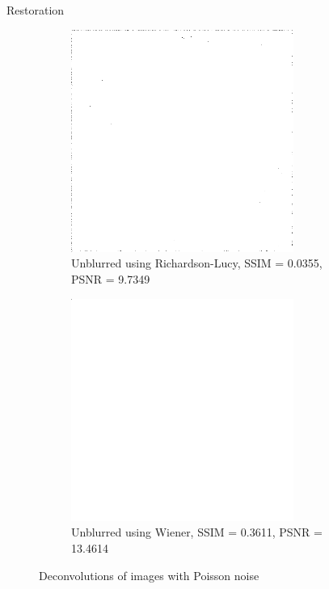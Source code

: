 \documentclass[aspectratio=1610]{beamer}
\begin{document}
\begin{frame}{Restoration}
  \begin{figure}
    \centering
    \begin{subfigure}[t]{0.4\textwidth}
        \includegraphics[width=0.8\textwidth]{images/unblurred_rl_p_noise.png}
        \caption{Unblurred using Richardson-Lucy, \break SSIM = 0.0355, PSNR = 9.7349}
        \label{fig:restored9}
    \end{subfigure}
    \begin{subfigure}[t]{0.4\textwidth}
        \includegraphics[width=0.8\textwidth]{images/unblurred_w_p_noise.png}
        \caption{Unblurred using Wiener, \break SSIM = 0.3611, PSNR = 13.4614}
        \label{fig:restored10}
    \end{subfigure}
    \caption{Deconvolutions of images with Poisson noise}
  \end{figure}
\end{frame}
\end{document}
